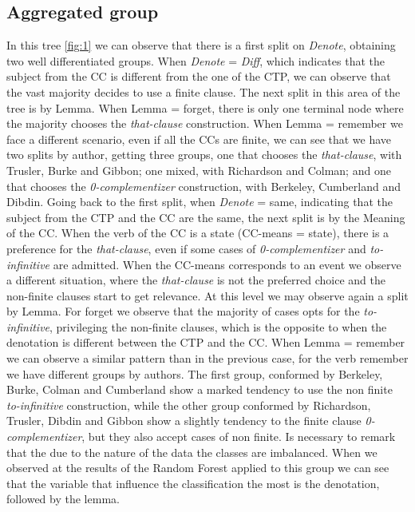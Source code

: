 \documentclass[final]{clv3} %
\begin{document}
\subsection{Aggregated group}
In this tree \cref{fig:1} we can observe that there is a first split on \textit{Denote}, obtaining two well differentiated groups. When \textit{Denote} = \textit{Diff}, which indicates that the subject from the CC is different from the one of the CTP, we can observe that the vast majority decides to use a finite clause. The next split in this area of the tree is by Lemma. When Lemma = forget, there is only one terminal node where the majority chooses the \textit{that-clause} construction. When Lemma = remember we face a different scenario, even if all the CCs are finite, we can see that we have two splits by author, getting three groups, one that chooses the \textit{that-clause}, with Trusler, Burke and Gibbon; one mixed, with Richardson and Colman; and one that chooses the \textit{0-complementizer} construction, with Berkeley, Cumberland and Dibdin. Going back to the first split, when \textit{Denote} = same, indicating that the subject from the CTP and the CC are the same, the next split is by the Meaning of the CC. When the verb of the CC is a state (CC-means = state), there is a preference for the \textit{that-clause}, even if some cases of \textit{0-complementizer} and \textit{to-infinitive} are admitted. When the CC-means corresponds to an event we observe a different situation, where the \textit{that-clause} is not the preferred choice and the non-finite clauses start to get relevance. At this level we may observe again a split by Lemma. For forget we observe that the majority of cases opts for the \textit{to-infinitive}, privileging the non-finite clauses, which is the opposite to when the denotation is different between the CTP and the CC. When Lemma = remember we can observe a similar pattern than in the previous case, for the verb remember we have different groups by authors. The first group, conformed by Berkeley, Burke, Colman and Cumberland show a marked tendency to use the non finite \textit{to-infinitive} construction, while the other group conformed by Richardson, Trusler, Dibdin and Gibbon show a slightly tendency to the finite clause \textit{0-complementizer}, but they also accept cases of non finite. Is necessary to remark that the due to the nature of the data the classes are imbalanced. When we observed at the results of the Random Forest applied to this group we can see that the variable that influence the classification the most is the denotation, followed by the lemma.
\end{document}
